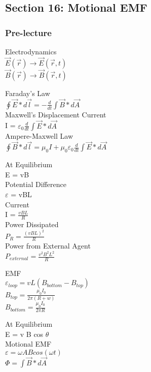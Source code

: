 \documentclass{article}
\begin{document}
\subsection{Section 16: Motional EMF}
\subsubsection{Pre-lecture}

\noindent 
Electrodynamics \\
$\vec{E}(\vec{r}) \to \vec{E}(\vec{r},t)$ \\
$\vec{B}(\vec{r}) \to \vec{B}(\vec{r},t)$ 

\vspace{2mm}

\noindent
Faraday's Law \\
$\oint \vec{E} * d\vec{l} = -\frac{d}{dt} \int \vec{B}* d\vec{A}$ \\
Maxwell's Displacement Current \\
I = $\varepsilon_0 \frac{d}{dt} \int \vec{E}*d\vec{A}$ \\
Ampere-Maxwell Law \\
$\oint \vec{B}*d\vec{l} = \mu_0 I + \mu_0 \varepsilon_0 \frac{d}{dt} \int \vec{E} * d\vec{A}$

\vspace{2mm}

\noindent
At Equilibrium \\
E = vB \\
Potential Difference \\
$\varepsilon$ = vBL \\
Current \\
I = $\frac{vBL}{R}$ \\
Power Dissipated \\
$P_R = \frac{(vBL)^2}{R}$ \\
Power from External Agent \\
$P_{external} = \frac{v^2 B^2 L^2}{R}$

\vspace{2mm}

\noindent
EMF \\
$\varepsilon_{loop} = vL(B_{bottom} - B_{top})$ \\
$B_{top} = \frac{\mu_0 I_0}{2 \pi (R+w)}$ \\
$B_{bottom} = \frac{\mu_0 I_0}{2 \pi R}$

\vspace{2mm}

\noindent
At Equilibrium \\
E = v B cos $\theta$ \\
Motional EMF \\
$\varepsilon = \omega A B cos(\omega t)$ \\
$\Phi = \int \vec{B} * d \vec{A}$
\end{document}
